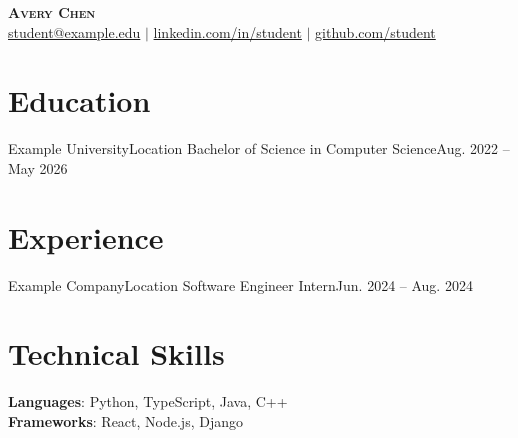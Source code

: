\documentclass[letterpaper,11pt]{article}
\begin{document}
\begin{center}
    \textbf{\Huge \scshape Avery Chen} \\ \small
    \href{mailto:student@example.edu}{student@example.edu} $|$ 
    \href{https://linkedin.com/in/student}{linkedin.com/in/student} $|$
    \href{https://github.com/student}{github.com/student}
\end{center}

\section{Education}
  \resumeSubHeadingListStart
    \resumeSubheading
      {Example University}{Location}
      {Bachelor of Science in Computer Science}{Aug. 2022 -- May 2026}
  \resumeSubHeadingListEnd

\section{Experience}
  \resumeSubHeadingListStart
    \resumeSubheading
      {Example Company}{Location}
      {Software Engineer Intern}{Jun. 2024 -- Aug. 2024}
      \resumeItemListStart
      \resumeItemListEnd
  \resumeSubHeadingListEnd

\section{Technical Skills}
 \begin{itemize}[leftmargin=0.15in, label={}]
    \small{\item{
     \textbf{Languages}{: Python, TypeScript, Java, C++} \\
     \textbf{Frameworks}{: React, Node.js, Django}
    }}
 \end{itemize}
\end{document}
